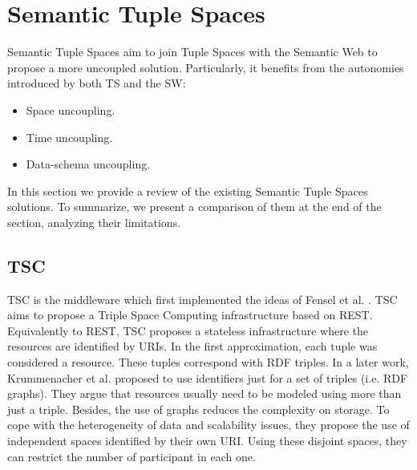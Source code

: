 \section{Semantic Tuple Spaces}
\label{sec:tsc_soa}


Semantic Tuple Spaces aim to join Tuple Spaces with the Semantic Web to propose a more uncoupled solution.
Particularly, it benefits from the autonomies introduced by both TS and the SW:

\begin{itemize}
  \item Space uncoupling.
  \item Time uncoupling.
  \item Data-schema uncoupling. %
\end{itemize}


In this section we provide a review of the existing Semantic Tuple Spaces solutions. %
To summarize, we present a comparison of them at the end of the section, analyzing their limitations.




\subsection{TSC}
TSC \cite{fensel_tsc_2007} is the middleware which first implemented the ideas of Fensel et al. \cite{fensel_triple-space_2004}.
TSC aims to propose a Triple Space Computing infrastructure based on REST.
Equivalently to REST, TSC proposes a stateless infrastructure where the resources are identified by URIs.
In the first approximation, each tuple was considered a resource.
These tuples correspond with RDF triples.
In a later work,  Krummenacher et al. \cite{krummenacher2006specification} proposed to use identifiers just for a set of triples (i.e. RDF graphs).
They argue that resources usually need to be modeled using more than just a triple.
Besides, the use of graphs reduces the complexity on storage.
To cope with the heterogeneity of data and scalability issues, they propose the use of independent spaces identified by their own URI.
Using these disjoint spaces, they can restrict the number of participant in each one.



